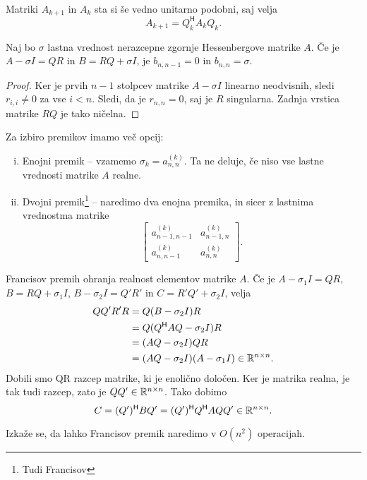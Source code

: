 \begin{opomba}
Matriki $A_{k+1}$ in $A_k$ sta si še vedno unitarno podobni, saj
velja
\[
A_{k+1} = Q_k^\mathsf{H} A_k Q_k.
\]
\end{opomba}

\begin{lema}
Naj bo $\sigma$ lastna vrednost nerazcepne zgornje Hessenbergove
matrike $A$. Če je $A - \sigma I = QR$ in $B = RQ + \sigma I$,
je $b_{n, n-1} = 0$ in $b_{n,n} = \sigma$.
\end{lema}

\begin{proof}
Ker je prvih $n-1$ stolpcev matrike $A - \sigma I$ linearno
neodvisnih, sledi $r_{i,i} \ne 0$ za vse $i < n$. Sledi, da je
$r_{n,n} = 0$, saj je $R$ singularna. Zadnja vrstica matrike $RQ$
je tako ničelna.
\end{proof}

\begin{opomba}
Za izbiro premikov imamo več opcij:

\begin{enumerate}[i)]
\item Enojni premik -- vzamemo $\sigma_k = a_{n,n}^{(k)}$. Ta ne
deluje, če niso vse lastne vrednosti matrike $A$ realne.
\item Dvojni premik\footnote{Tudi Francisov} -- naredimo dva enojna
premika, in sicer z lastnima vrednostma matrike
\[
\begin{bmatrix}
a_{n-1,n-1}^{(k)} & a_{n-1,n}^{(k)} \\
 a_{n,n-1}^{(k)}  &  a_{n,n}^{(k)}
\end{bmatrix}.
\]
\end{enumerate}
\end{opomba}

\begin{opomba}
Francisov premih ohranja realnost elementov matrike $A$. Če je
$A - \sigma_1 I = QR$, $B = RQ + \sigma_1 I$,
$B - \sigma_2 I = Q'R'$ in $C = R'Q' + \sigma_2 I$, velja
\begin{align*}
QQ'R'R &=
Q (B - \sigma_2 I) R
\\
&=
Q (Q^\mathsf{H} A Q - \sigma_2 I) R
\\
&=
(AQ - \sigma_2 I) QR
\\
&=
(AQ - \sigma_2 I) (A - \sigma_1 I) \in \mathbb{R}^{n \times n}.
\end{align*}
Dobili smo QR razcep matrike, ki je enolično določen. Ker je
matrika realna, je tak tudi razcep, zato je
$QQ' \in \mathbb{R}^{n \times n}$. Tako dobimo
\[
C = (Q')^\mathsf{H} B Q' =
(Q')^\mathsf{H} Q^\mathsf{H} A Q Q' \in \mathbb{R}^{n \times n}. \qedhere
\]
\end{opomba}

\begin{opomba}
Izkaže se, da lahko Francisov premik naredimo v $O(n^2)$
operacijah.
\end{opomba}
